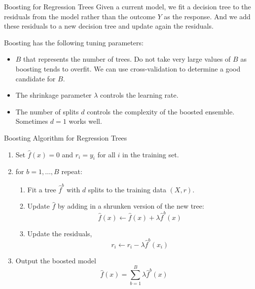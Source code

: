 \documentclass{beamer}
\begin{document}
\begin{frame}{Boosting for Regression Trees}
	Given a current model, we fit a decision tree to the residuals from the model rather than the outcome $Y$ as the response. And we add these residuals to a new decision tree and update again the residuals. 
	
	Boosting has the following tuning parameters:
	
	\begin{itemize}
		\item $B$ that represents the number of trees. Do not take very large values of $B$ as boosting tends to overfit. We can use cross-validation to determine a good candidate for $B$.
		\item The shrinkage parameter $\lambda$ controls the learning rate. 
		\item The number of splits $d$ controls the complexity of the boosted ensemble. Sometimes $d=1$ works well. 
\end{itemize} \end{frame}

\begin{frame}{Boosting Algorithm for Regression Trees}
	\begin{enumerate}
		\item Set $\hat{f}(x)=0$ and $r_i=y_i$ for all $i$ in the training set. 
		\item for $b=1,\ldots, B$ repeat:
		\begin{enumerate}
			\item Fit a tree $\hat{f}^b$ with $d$ splits to the training data $(X,r)$.
			\item Update $\hat{f}$ by adding in a shrunken version of the new tree:
			\begin{equation*}
				\hat{f}(x) \leftarrow \hat{f}(x)+ \lambda \hat{f}^b (x)
			\end{equation*}
		\item Update the residuals,
		\begin{equation*}
			r_i \leftarrow r_i - \lambda \hat{f}^b(x_i)
		\end{equation*}
		\end{enumerate}
	\item Output the boosted model
	\begin{equation}
		\hat{f}(x)=\sum_{b=1}^B \lambda \hat{f}^b(x)
	\end{equation}
	\end{enumerate}
\end{frame}
\end{document}
